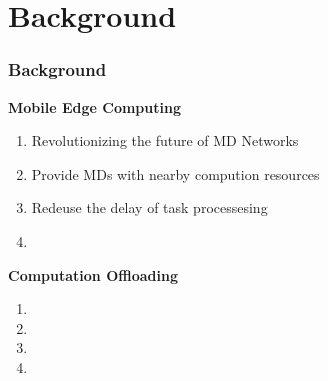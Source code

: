 \section{Background}

\begin{frame}
\frametitle{Background}

\textbf{Mobile Edge Computing} 



\begin{enumerate}[]

	\item{Revolutionizing the future of MD Networks}
	
	\item{Provide MDs with nearby compution resources} 
	
	\item{Redeuse the delay of task processesing}
	
	
	
	\item{}
	
\end{enumerate}

\textbf{Computation Offloading} 

\begin{enumerate}[]
	
	\item{} 
	
	\item{}
	\item{}

	\item{}
	
\end{enumerate}

\end{frame}